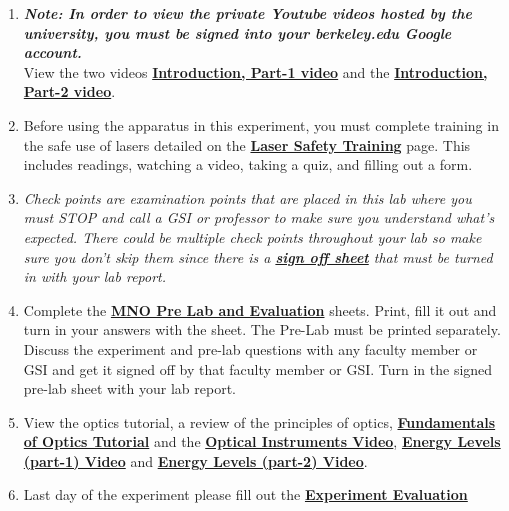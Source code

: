 \documentclass{../lab}
\begin{document}
\begin{enumerate}

    \item \emph{\textbf{Note: In order to view the private Youtube videos hosted by the university, you must be signed into your berkeley.edu Google account.}}\\ 
    View the two videos \href{http://youtu.be/JZJlyaIT3B4}{\textbf{Introduction, Part-1 video}} and the \href{http://youtu.be/h81p2LXkgZY}{\textbf{Introduction, Part-2 video}}.

    \item Before using the apparatus in this experiment, you must complete training in the safe use of lasers detailed on the \href{http://experimentationlab.berkeley.edu/lasersafety}{\textbf{Laser Safety Training}} page. This includes readings, watching a video, taking a quiz, and filling out a form.
    
    \item \emph{Check points are examination points that are placed in this lab where you must STOP and call a GSI or professor to make sure you understand what's expected. There could  be multiple check points throughout your lab so make sure you don't skip them since there is a \href{http://experimentationlab.berkeley.edu/mnocheckpoints}{\textbf{sign off sheet}} that must be turned in with your lab report.}

    \item Complete the \href{http://experimentationlab.berkeley.edu/MNOprelab}{\textbf{MNO Pre Lab and Evaluation}} sheets. Print, fill it out and turn in your answers with the sheet. The Pre-Lab must be printed separately. Discuss the experiment and pre-lab questions with any faculty member or GSI and get it signed off by that faculty member or GSI. Turn in the signed pre-lab sheet with your lab report.

    \item View the optics tutorial, a review of the principles of optics, \href{http://experimentationlab.berkeley.edu/sites/default/files/ATM/fundamental-Optics.pdf}{\textbf{Fundamentals of Optics Tutorial}} and the \href{http://youtu.be/zUGBt5vc5FA}{\textbf{Optical Instruments Video}}, \href{http://youtu.be/wyBOVjU5bBQ}{\textbf{Energy Levels (part-1) Video}} and \href{http://youtu.be/Eypw0DmVBxk}{\textbf{Energy Levels (part-2) Video}}.

    \item Last day of the experiment please fill out the \href{\ExperimentEvaluation}{\textbf{Experiment Evaluation}}

\end{enumerate}
\end{document}
